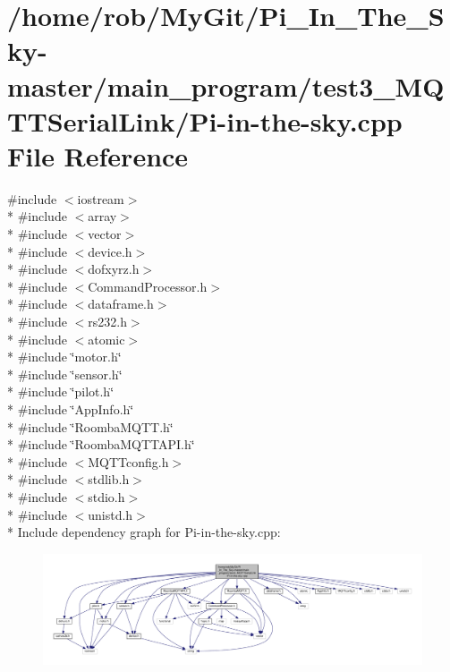 \hypertarget{test3___m_q_t_t_serial_link_2_pi-in-the-sky_8cpp}{}\section{/home/rob/\+My\+Git/\+Pi\+\_\+\+In\+\_\+\+The\+\_\+\+Sky-\/master/main\+\_\+program/test3\+\_\+\+M\+Q\+T\+T\+Serial\+Link/\+Pi-\/in-\/the-\/sky.cpp File Reference}
\label{test3___m_q_t_t_serial_link_2_pi-in-the-sky_8cpp}
{\ttfamily \#include $<$iostream$>$}\\*
{\ttfamily \#include $<$array$>$}\\*
{\ttfamily \#include $<$vector$>$}\\*
{\ttfamily \#include $<$device.\+h$>$}\\*
{\ttfamily \#include $<$dofxyrz.\+h$>$}\\*
{\ttfamily \#include $<$Command\+Processor.\+h$>$}\\*
{\ttfamily \#include $<$dataframe.\+h$>$}\\*
{\ttfamily \#include $<$rs232.\+h$>$}\\*
{\ttfamily \#include $<$atomic$>$}\\*
{\ttfamily \#include \char`\"{}motor.\+h\char`\"{}}\\*
{\ttfamily \#include \char`\"{}sensor.\+h\char`\"{}}\\*
{\ttfamily \#include \char`\"{}pilot.\+h\char`\"{}}\\*
{\ttfamily \#include \char`\"{}App\+Info.\+h\char`\"{}}\\*
{\ttfamily \#include \char`\"{}Roomba\+M\+Q\+T\+T.\+h\char`\"{}}\\*
{\ttfamily \#include \char`\"{}Roomba\+M\+Q\+T\+T\+A\+P\+I.\+h\char`\"{}}\\*
{\ttfamily \#include $<$M\+Q\+T\+Tconfig.\+h$>$}\\*
{\ttfamily \#include $<$stdlib.\+h$>$}\\*
{\ttfamily \#include $<$stdio.\+h$>$}\\*
{\ttfamily \#include $<$unistd.\+h$>$}\\*
Include dependency graph for Pi-\/in-\/the-\/sky.cpp\+:\nopagebreak
\begin{figure}[H]
\begin{center}
\leavevmode
\includegraphics[width=350pt]{test3___m_q_t_t_serial_link_2_pi-in-the-sky_8cpp__incl}
\end{center}
\end{figure}
